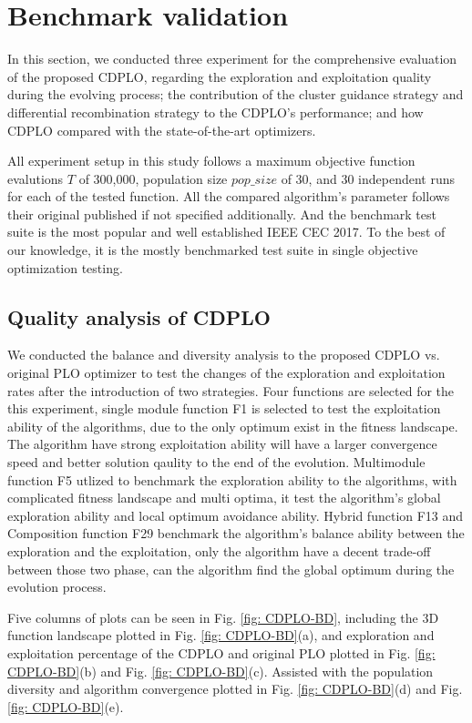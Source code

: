 \documentclass[3p]{elsarticle}
\begin{document}
\section{Benchmark validation}
In this section, we conducted three experiment for the comprehensive evaluation of the proposed CDPLO, regarding the exploration and exploitation quality during the evolving process; the contribution of the cluster guidance strategy and differential recombination strategy to the CDPLO's performance; and how CDPLO compared with the state-of-the-art optimizers.

All experiment setup in this study follows a maximum objective function evalutions $T$ of 300,000, population size $pop\_size$ of 30, and 30 independent runs for each of the tested function. All the compared algorithm's parameter follows their original published if not specified additionally. And the benchmark test suite is the most popular and well established IEEE CEC 2017. To the best of our knowledge, it is the mostly benchmarked test suite in single objective optimization testing.

\subsection{Quality analysis of CDPLO}
We conducted the balance and diversity analysis to the proposed CDPLO vs. original PLO optimizer to test the changes of the exploration and exploitation rates after the introduction of two strategies. Four functions are selected for the this experiment, single module function F1 is selected to test the exploitation ability of the algorithms, due to the only optimum exist in the fitness landscape. The algorithm have strong exploitation ability will have a larger convergence speed and better solution qaulity to the end of the evolution. Multimodule function F5 utlized to benchmark the exploration ability to the algorithms, with complicated fitness landscape and multi optima, it test the algorithm's global exploration ability and local optimum avoidance ability. Hybrid function F13 and Composition function F29 benchmark the algorithm's balance ability between the exploration and the exploitation, only the algorithm have a decent trade-off between those two phase, can the algorithm find the global optimum during the evolution process.

Five columns of plots can be seen in Fig. \ref{fig: CDPLO-BD}, including the 3D function landscape plotted in Fig. \ref{fig: CDPLO-BD}(a), and exploration and exploitation percentage of the CDPLO and original PLO plotted in Fig. \ref{fig: CDPLO-BD}(b) and Fig. \ref{fig: CDPLO-BD}(c). Assisted with the population diversity and algorithm convergence plotted in Fig. \ref{fig: CDPLO-BD}(d) and Fig. \ref{fig: CDPLO-BD}(e).
\end{document}
